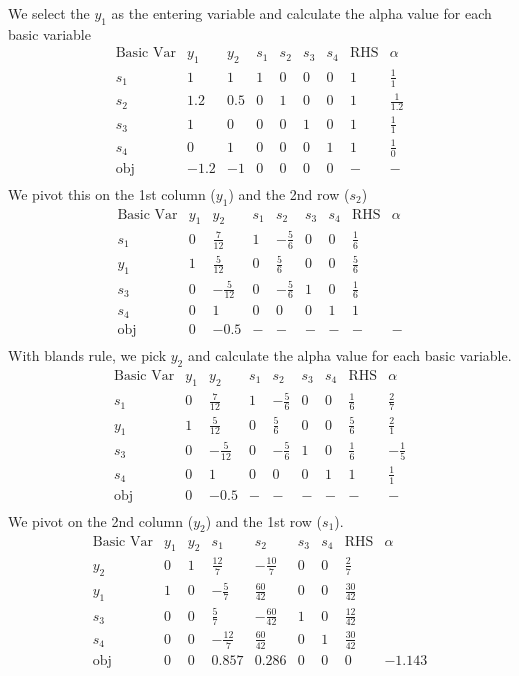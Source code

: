 \documentclass[11pt]{article}
\begin{document}
We select the $y_1$ as the entering variable and calculate the alpha value for each basic variable
\[
\begin{array}{c|cccccc|c|c}
\text{Basic Var} & y_1 & y_2 & s_1 & s_2 & s_3 & s_4 & \text{RHS} & \alpha \\
\hline
s_1 & 1 & 1 & 1 & 0 & 0 & 0 & 1 & \frac{1}{1} \\
s_2 & 1.2 & 0.5 & 0 & 1 & 0 & 0 & 1 & \frac{1}{1.2} \\
s_3 & 1 & 0 & 0 & 0 & 1 & 0 & 1 & \frac{1}{1} \\
s_4 & 0 & 1 & 0 & 0 & 0 & 1 & 1 & \frac{1}{0} \\
\hline
\text{obj} & -1.2 & -1 & 0 & 0 & 0 & 0 & - & - \\
\end{array}
\]
We pivot this on the 1st column ($y_1$) and the 2nd row ($s_2$)
\[
\begin{array}{c|cccccc|c|c}
\text{Basic Var} & y_1 & y_2 & s_1 & s_2 & s_3 & s_4 & \text{RHS} & \alpha \\
\hline
s_1 & 0 & \frac{7}{12} & 1 & -\frac{5}{6} & 0 & 0 & \frac{1}{6} &  \\
y_1 & 1 & \frac{5}{12} & 0 & \frac{5}{6} & 0 & 0 & \frac{5}{6} &  \\
s_3 & 0 & -\frac{5}{12} & 0 &  -\frac{5}{6} & 1 & 0 & \frac{1}{6} &  \\
s_4 & 0 & 1 & 0 &  0 & 0 & 1 & 1 &  \\
\hline
\text{obj} & 0 & -0.5 & - & - & - & - & - & - \\
\end{array}
\]
With blands rule, we pick $y_2$ and calculate the alpha value for each basic variable.
\[
\begin{array}{c|cccccc|c|c}
\text{Basic Var} & y_1 & y_2 & s_1 & s_2 & s_3 & s_4 & \text{RHS} & \alpha \\
\hline
s_1 & 0 & \frac{7}{12} & 1 & -\frac{5}{6} & 0 & 0 & \frac{1}{6} & \frac{2}{7} \\
y_1 & 1 & \frac{5}{12} & 0 & \frac{5}{6} & 0 & 0 & \frac{5}{6} & \frac{2}{1} \\
s_3 & 0 & -\frac{5}{12} & 0 &  -\frac{5}{6} & 1 & 0 & \frac{1}{6} & -\frac{1}{5} \\
s_4 & 0 & 1 & 0 &  0 & 0 & 1 & 1 & \frac{1}{1} \\
\hline
\text{obj} & 0 & -0.5 & - & - & - & - & - & - \\
\end{array}
\]
We pivot on the 2nd column ($y_2$) and the 1st row ($s_1$).
\[
\begin{array}{c|cccccc|c|c}
\text{Basic Var} & y_1 & y_2 & s_1 & s_2 & s_3 & s_4 & \text{RHS} & \alpha \\
\hline
y_2 & 0 & 1 & \frac{12}{7} & -\frac{10}{7} & 0 & 0 & \frac{2}{7} &  \\
y_1 & 1 & 0 & -\frac{5}{7} & \frac{60}{42} & 0 & 0 & \frac{30}{42} &  \\
s_3 & 0 & 0 & \frac{5}{7} &  -\frac{60}{42} & 1 & 0 & \frac{12}{42} &  \\
s_4 & 0 & 0 & -\frac{12}{7} &  \frac{60}{42} & 0 & 1 & \frac{30}{42} &  \\
\hline
\text{obj} & 0 & 0 & 0.857 & 0.286  & 0 & 0 & 0 & -1.143 \\
\end{array}
\]
\end{document}
